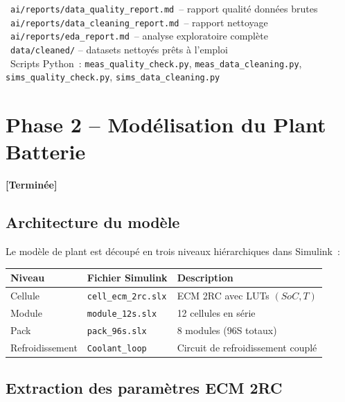 \documentclass[a4paper,11pt]{article}
\newcommand{\done}{\textcolor{statusdone}{\textbf{\checkmark}}}
\begin{document}
\begin{resultbox}
\done~\texttt{ai/reports/data\_quality\_report.md}~-- rapport qualité données brutes\\
\done~\texttt{ai/reports/data\_cleaning\_report.md}~-- rapport nettoyage\\
\done~\texttt{ai/reports/eda\_report.md}~-- analyse exploratoire complète\\
\done~\texttt{data/cleaned/} -- datasets nettoyés prêts à l'emploi\\
\done~Scripts Python~: \texttt{meas\_quality\_check.py}, \texttt{meas\_data\_cleaning.py},
      \texttt{sims\_quality\_check.py}, \texttt{sims\_data\_cleaning.py}
\end{resultbox}

\newpage
\section{Phase 2 -- Modélisation du Plant Batterie}
\textcolor{statusdone}{\textbf{[Terminée]}}

\subsection{Architecture du modèle}

Le modèle de plant est découpé en trois niveaux hiérarchiques dans Simulink~:

\begin{center}
\small\renewcommand{\arraystretch}{1.3}
\begin{tabular}{lll}
\toprule
\textbf{Niveau} & \textbf{Fichier Simulink} & \textbf{Description} \\
\midrule
Cellule & \texttt{cell\_ecm\_2rc.slx} & ECM 2RC avec LUTs $(SoC, T)$ \\
Module & \texttt{module\_12s.slx} & 12 cellules en série \\
Pack & \texttt{pack\_96s.slx} & 8 modules (96S totaux) \\
Refroidissement & \texttt{Coolant\_loop} & Circuit de refroidissement couplé \\
\bottomrule
\end{tabular}
\end{center}

\subsection{Extraction des paramètres ECM 2RC}
\end{document}
